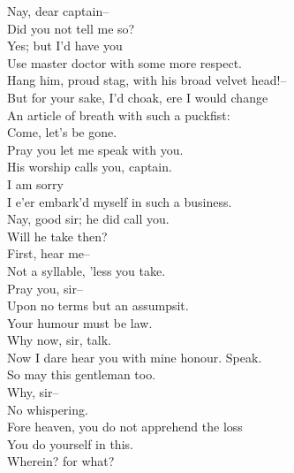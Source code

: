 \documentclass{memoir}
\begin{document}
\begin{drama*}
\dapperspeaks {} Nay, dear captain--\\
\facespeaks  Did you not tell me so?\\
\dapperspeaks {} Yes; but I'd have you\\
 Use master doctor with some more respect.\\
\facespeaks  Hang him, proud stag, with his broad velvet head!--\\
 But for your sake, I'd choak, ere I would change\\
 An article of breath with such a puckfist:\\
 Come, let's be gone.\\
\subtlespeaks {} Pray you let me speak with you.\\
\dapperspeaks  His worship calls you, captain.\\
\facespeaks {} I am sorry\\
 I e'er embark'd myself in such a business.\\
\dapperspeaks  Nay, good sir; he did call you.\\
\facespeaks {} Will he take then?\\
\subtlespeaks  First, hear me--\\
\facespeaks {} Not a syllable, 'less you take.\\
\subtlespeaks  Pray you, sir--\\
\facespeaks {} Upon no terms but an assumpsit.\\
\subtlespeaks  Your humour must be law.\\
\facespeaks {} Why now, sir, talk.\\
 Now I dare hear you with mine honour. Speak.\\
 So may this gentleman too.\\
\subtlespeaks {} Why, sir--\\
\facespeaks {} No whispering.\\
\subtlespeaks  Fore heaven, you do not apprehend the loss\\
 You do yourself in this.\\
\facespeaks {} Wherein? for what?\\

\end{drama*}
\end{document}
